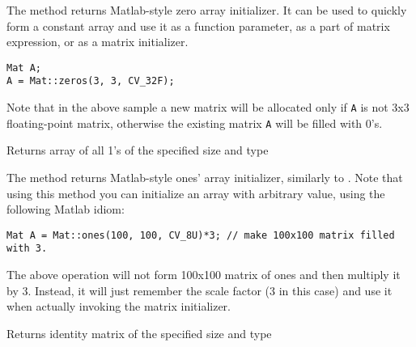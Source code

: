 The method returns Matlab-style zero array initializer. It can be used to quickly form a constant array and use it as a function parameter, as a part of matrix expression, or as a matrix initializer.

\begin{lstlisting}
Mat A;
A = Mat::zeros(3, 3, CV_32F);
\end{lstlisting}

Note that in the above sample a new matrix will be allocated only if \texttt{A} is not 3x3 floating-point matrix, otherwise the existing matrix \texttt{A} will be filled with 0's.


Returns array of all 1's of the specified size and type

\begin{description}
\end{description}

The method returns Matlab-style ones' array initializer, similarly to . Note that using this method you can initialize an array with arbitrary value, using the following Matlab idiom:

\begin{lstlisting}
Mat A = Mat::ones(100, 100, CV_8U)*3; // make 100x100 matrix filled with 3.
\end{lstlisting}

The above operation will not form 100x100 matrix of ones and then multiply it by 3. Instead, it will just remember the scale factor (3 in this case) and use it when actually invoking the matrix initializer.

Returns identity matrix of the specified size and type

\begin{description}
\end{description}

